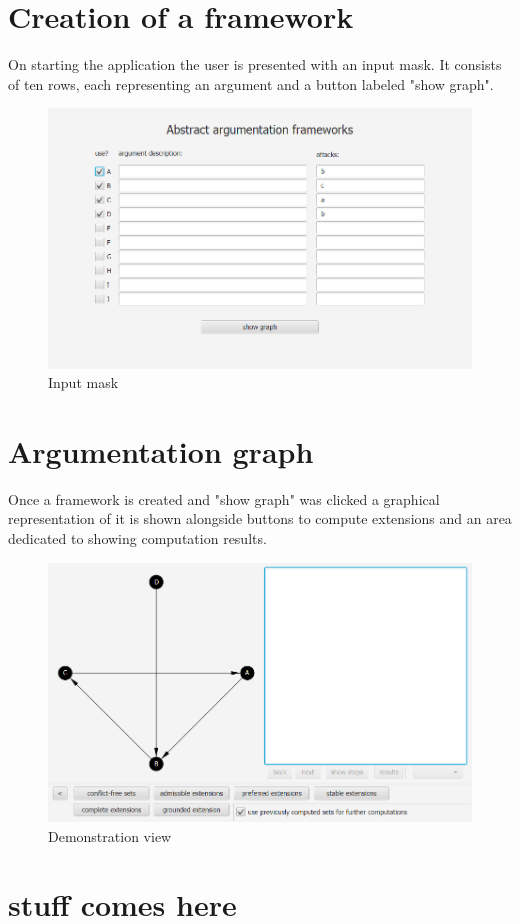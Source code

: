 \documentclass[draft,final]{vutinfth} %
\begin{document}
\section{Creation of a framework}
On starting the application the user is presented with an input mask. It consists of ten rows, each representing an argument and a button labeled "show graph".

\FloatBarrier
	\centering
	\begin{figure}[!htb]
		\includegraphics[width=\linewidth]{pics/input.png}
		\caption{Input mask}
	\end{figure}
\FloatBarrier

\section{Argumentation graph}
Once a framework is created and "show graph" was clicked a graphical representation of it is shown alongside buttons to compute extensions and an area dedicated to showing computation results.

\FloatBarrier
	\centering
	\begin{figure}[!htb]
		\includegraphics[width=\linewidth]{pics/demo.png}
		\caption{Demonstration view}
	\end{figure}
\FloatBarrier

\section{stuff comes here}

\backmatter




\printindex

\printglossaries
\end{document}
